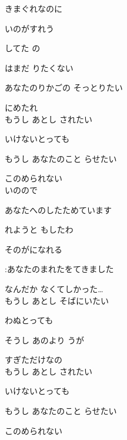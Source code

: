 \large{

きまぐれなのに

いのがすれう

してた の

はまだ りたくない

あなたのりかごの そっとりたい

にめたれ
\\

もうし あとし されたい

いけないとっても

もうし あなたのこと らせたい

このめられない
\\

いのので

あなたへのしたためています

れようと もしたわ

そのがになれる

:あなたのまれたをてきました

なんだか なくてしかった…
\\

もうし あとし そばにいたい

わぬとっても

そうし あのより うが

すぎただけなの
\\

もうし あとし されたい

いけないとっても

もうし あなたのこと らせたい

このめられない

}